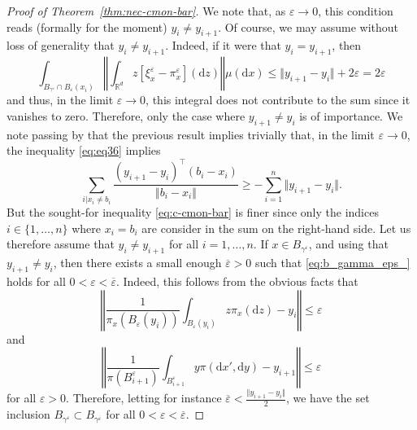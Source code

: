 \documentclass[10pt,a4paper]{amsart}
\newcommand{\R}{\mathbb{R}}
\newcommand{\dd}{\mathrm{d}}
\newcommand{\eps}{\varepsilon}
\begin{document}
\begin{proof}[Proof of Theorem~\ref{thm:nec-cmon-bar}]
     We note that, as $\eps \to 0$, this condition reads (formally for the moment) $y_i \neq y_{i+1}$. Of course, we may assume without loss of generality that $y_i \neq y_{i+1}$. Indeed, if it were that $y_i = y_{i+1}$, then
\begin{equation}
    \int_{B_{\gamma^\eps} \cap B_\eps(x_i)} \left\Vert \int_{\R^d} z [\xi^\eps_x - \pi^\eps_x](\dd z) \right\Vert \mu(\dd x) \leq \Vert y_{i+1} - y_i \Vert + 2\eps = 2\eps
\end{equation}
and thus, in the limit $\eps \to 0$, this integral does not contribute to the sum since it vanishes to zero. Therefore, only the case where $y_{i+1} \neq y_i$ is of importance. We note passing by that the previous result implies trivially that, in the limit $\eps \to 0$, the inequality \eqref{eq:eq36} implies
\begin{equation}
\sum_{i | x_i \neq b_i} \frac{(y_{i+1} - y_i)^\intercal(b_i - x_i)}{\Vert b_i - x_i \Vert} \geq -\sum_{i = 1}^n \Vert y_{i+1} -y_{i} \Vert.
\end{equation}
But the sought-for inequality \eqref{eq:c-cmon-bar} is finer since only the indices $i \in \{1, \dots, n\}$ where $x_i = b_i$ are consider in the sum on the right-hand side. Let us therefore assume that $y_i \neq y_{i+1}$ for all $i = 1, \dots,n$. If $x \in B_{\gamma^{\eps}}$, and using that $y_{i+1} \neq y_i$, then there exists a small enough $\overline{\eps} > 0$ such that \eqref{eq:b_gamma_eps_} holds for all $0 < \eps < \overline{\eps}$. Indeed, this follows from the obvious facts that 
$$
\left\Vert\frac{1}{\pi_x(B_\eps(y_i))} \int_{B_\eps(y_i)} z \pi_x(\dd z) - y_i \right\Vert \leq \eps
$$
and 
$$
\left\Vert \frac{1}{\pi(B_{i+1}^\eps)} \int_{B_{i+1}^\eps} y \pi(\dd x', \dd y) -y_{i+1} \right \Vert \leq \eps
$$
for all $\eps > 0$. Therefore, letting for instance $\overline{\eps} < \frac{\Vert y_{i+1} - y_i \Vert}{2}$, we have the set inclusion $B_{\gamma^{\eps}} \subset B_{\gamma^{\overline{\eps}}}$ for all $0 < \eps < \overline{\eps}$. 


\end{proof}
\end{document}
